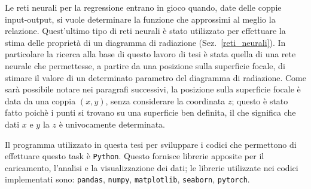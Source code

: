 \documentclass[12pt,a4paper,final]{book}
\begin{document}
Le reti neurali per la regressione entrano in gioco quando, date delle coppie input-output, si vuole determinare la funzione che approssimi al meglio la relazione. Quest'ultimo tipo di reti neurali è stato utilizzato per effettuare la stima delle proprietà di un diagramma di radiazione (Sez.~\ref{reti_neurali}). In particolare la ricerca alla base di questo lavoro di tesi è stata quella di una rete neurale che permettesse, a partire da una posizione sulla superficie focale, di stimare il valore di un determinato parametro del diagramma di radiazione. Come sarà possibile notare nei paragrafi successivi, la posizione sulla superficie focale è data da una coppia $(x, y)$, senza considerare la coordinata $z$; questo è stato fatto poichè i punti si trovano su una superficie ben definita, il che significa che dati $x$ e $y$ la $z$ è univocamente determinata.


Il programma utilizzato in questa tesi per sviluppare i codici che permettono di effettuare questo task è \texttt{Python}. Questo fornisce librerie apposite per il caricamento, l'analisi e la visualizzazione dei dati; le librerie utilizzate nei codici implementati sono: \texttt{pandas}, \texttt{numpy}, \texttt{matplotlib}, \texttt{seaborn}, \texttt{pytorch}.

\end{document}
